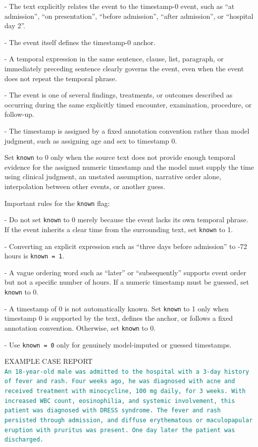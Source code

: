 \begin{tcolorbox}
- The text explicitly relates the event to the timestamp-0 event, such as ``at admission'', ``on presentation'', ``before admission'', ``after admission'', or ``hospital day 2''.

- The event itself defines the timestamp-0 anchor.

- A temporal expression in the same sentence, clause, list, paragraph, or immediately preceding sentence clearly governs the event, even when the event does not repeat the temporal phrase.

- The event is one of several findings, treatments, or outcomes described as occurring during the same explicitly timed encounter, examination, procedure, or follow-up.

- The timestamp is assigned by a fixed annotation convention rather than model judgment, such as assigning age and sex to timestamp 0.

Set \texttt{known} to 0 only when the source text does not provide enough temporal evidence for the assigned numeric timestamp and the model must supply the time using clinical judgment, an unstated assumption, narrative order alone, interpolation between other events, or another guess.

Important rules for the \texttt{known} flag:

- Do not set \texttt{known} to 0 merely because the event lacks its own temporal phrase. If the event inherits a clear time from the surrounding text, set \texttt{known} to 1.

- Converting an explicit expression such as ``three days before admission'' to -72 hours is \texttt{known = 1}.

- A vague ordering word such as ``later'' or ``subsequently'' supports event order but not a specific number of hours. If a numeric timestamp must be guessed, set \texttt{known} to 0.

- A timestamp of 0 is not automatically known. Set \texttt{known} to 1 only when timestamp 0 is supported by the text, defines the anchor, or follows a fixed annotation convention. Otherwise, set \texttt{known} to 0.

- Use \texttt{known = 0} only for genuinely model-imputed or guessed timestamps.


EXAMPLE CASE REPORT\\


\textcolor{teal}{\texttt{An 18-year-old male was admitted to the hospital with a 3-day history of fever and rash. Four weeks ago, he was diagnosed with acne and received treatment with minocycline, 100 mg daily, for 3 weeks. With increased WBC count, eosinophilia, and systemic involvement, this patient was diagnosed with DRESS syndrome. The fever and rash persisted through admission, and diffuse erythematous or maculopapular eruption with pruritus was present. One day later the patient was discharged.}} \\



\end{tcolorbox}
